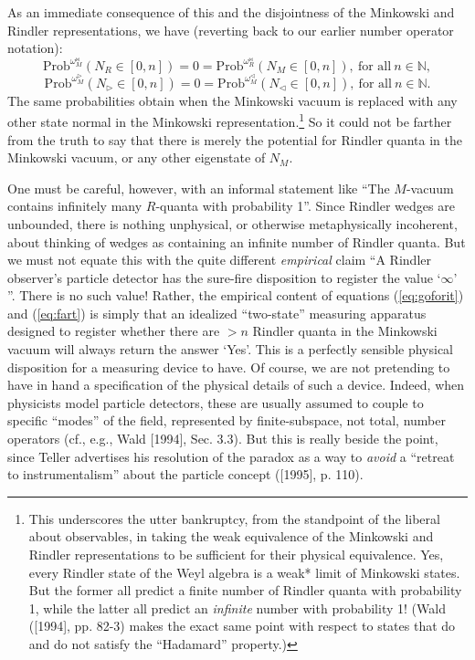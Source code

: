 \documentclass[12pt]{article}
\theoremstyle{remark}
\theoremstyle{definition}
\begin{document}
As an immediate consequence of this  and the 
disjointness of the Minkowski and Rindler representations, we have 
(reverting back to our earlier number operator notation): 
\begin{equation}  \label{eq:goforit}
\mathrm{Prob}^{\omega_{M}^{\bowtie}}(N_{R}\in [0,n])=0
=\mathrm{Prob}^{\omega_{R}^{\bowtie}}(N_{M}\in [0,n]),\ \mbox{for 
all}\ n\in \mathbb{N},
\end{equation}
\begin{equation} \label{eq:fart}
\mathrm{Prob}^{\omega_{M}^{\triangleright}}(N_{\triangleright}\in [0,n])=0
=\mathrm{Prob}^{\omega_{M}^{\triangleleft}}(N_{\triangleleft}\in [0,n]),\ \mbox{for 
all}\ n\in \mathbb{N}.
\end{equation}
The same probabilities obtain when the Minkowski vacuum is replaced 
with any other state normal in the Minkowski representation.\footnote{This underscores the utter bankruptcy, from the standpoint 
of the liberal about observables, in taking the weak 
equivalence of the Minkowski and Rindler 
representations to be sufficient for their physical 
equivalence.   Yes, every Rindler state of the Weyl algebra is 
a weak* limit of 
Minkowski states.  But the former all predict a finite number of 
Rindler quanta with probability 1, while the latter all predict an 
\emph{infinite} number with probability 1! (Wald ([1994], pp. 82-3) 
makes the exact same point with respect to states 
that do and do not satisfy the ``Hadamard'' property.)} 
So it could not be farther from the truth to say that there is merely the 
potential for Rindler 
quanta in the Minkowski vacuum, or any other eigenstate of $N_{M}$.  

One must be careful, however, with an informal statement like ``The
$M$-vacuum contains infinitely many $R$-quanta with probability 1''.  
Since Rindler wedges are unbounded, there is nothing unphysical, or 
otherwise metaphysically incoherent, about 
thinking of wedges as containing an infinite number of Rindler 
quanta.  But we must not equate this with the quite different \emph{empirical}
claim 
``A Rindler observer's particle detector
has the sure-fire disposition to register the value `$\infty$' ''.   There is no 
such value!  Rather, the empirical content of
 equations (\ref{eq:goforit}) and (\ref{eq:fart}) 
 is simply that an idealized ``two-state'' measuring
apparatus designed to register whether there are $> n$ Rindler quanta
in the Minkowski vacuum will always return the answer `Yes'.  This is
a perfectly sensible physical disposition for a measuring device to
have.  Of course, we are not pretending to have in hand a 
specification of the physical details of such a device.  Indeed, when 
physicists model particle detectors, 
these are usually assumed to 
couple to specific ``modes'' of the field, represented by 
finite-subspace, not total, number operators (cf., e.g., Wald [1994], 
Sec. 3.3).  But this is really beside the 
point, since Teller advertises his resolution of the paradox as a 
way to  \emph{avoid}  a ``retreat to instrumentalism'' about the particle 
concept ([1995], p. 110).  
\end{document}
